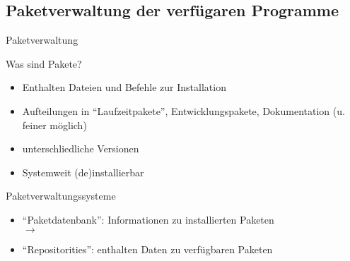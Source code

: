 \documentclass[aspectratio=43]{beamer}
\begin{document}
\subsection{Paketverwaltung der verfügaren Programme}
\begin{frame}{Paketverwaltung}
  \begin{block}{Was sind Pakete?}
    \begin{itemize}
      \item Enthalten Dateien und Befehle zur Installation 
      \item Aufteilungen in "`Laufzeitpakete"', Entwicklungspakete, Dokumentation (u. feiner möglich)
      \item unterschliedliche Versionen
      \item Systemweit (de)installierbar 
    \end{itemize}
  \end{block}
  \begin{block}{Paketverwaltungssysteme}
    \begin{itemize}
      \item "`Paketdatenbank"': Informationen zu installierten Paketen\\ $\rightarrow$ 
      \item "`Repositorities"':  enthalten Daten zu verfügbaren Paketen
    \end{itemize}
  \end{block}
\end{frame}
\end{document}
